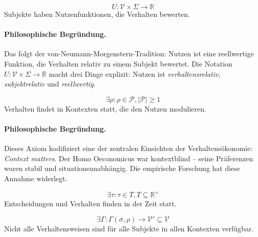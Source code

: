 \begin{axiom}
\begin{equation}
U: \mathcal{V} \times \Sigma \rightarrow \mathbb{R}
\end{equation}
Subjekte haben Nutzenfunktionen, die Verhalten bewerten.
\end{axiom}

\paragraph{Philosophische Begründung.}
Das \BCM{} folgt der von-Neumann-Morgenstern-Tradition: Nutzen ist eine reellwertige Funktion, die Verhalten relativ zu einem Subjekt bewertet. Die Notation $U: \mathcal{V} \times \Sigma \rightarrow \mathbb{R}$ macht drei Dinge explizit: Nutzen ist \textit{verhaltensrelativ}, \textit{subjektrelativ} und \textit{reellwertig}.

\begin{axiom}
\begin{equation}
\exists \rho: \rho \in \mathcal{P}, |\mathcal{P}| \geq 1
\end{equation}
Verhalten findet in Kontexten statt, die den Nutzen modulieren.
\end{axiom}

\paragraph{Philosophische Begründung.}
Dieses Axiom kodifiziert eine der zentralen Einsichten der Verhaltensökonomie: \textit{Context matters}. Der Homo Oeconomicus war kontextblind -- seine Präferenzen waren stabil und situationsunabhängig. Die empirische Forschung hat diese Annahme widerlegt.

\begin{axiom}
\begin{equation}
\exists \tau: \tau \in T, T \subseteq \mathbb{R}^+
\end{equation}
Entscheidungen und Verhalten finden in der Zeit statt.
\end{axiom}

\begin{axiom}
\begin{equation}
\exists \Gamma: \Gamma(\sigma, \rho) \rightarrow \mathcal{V}' \subseteq \mathcal{V}
\end{equation}
Nicht alle Verhaltensweisen sind für alle Subjekte in allen Kontexten verfügbar.
\end{axiom}

